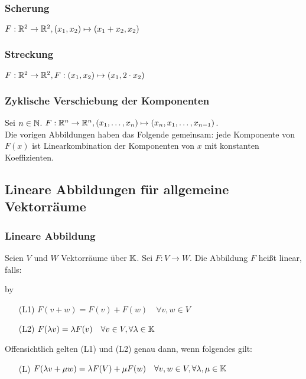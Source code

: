 \subsubsection{Scherung}
	$ F: \mathbb R^2 \to \mathbb R^2, (x_1, x_2) \mapsto (x_1 + x_2, x_2) $

\subsubsection{Streckung}
	$ F: \mathbb R^2 \to \mathbb R^2, F: (x_1, x_2) \mapsto (x_1, 2 \cdot x_2) $

\subsubsection{Zyklische Verschiebung der Komponenten}
	Sei $ n \in \mathbb N $. $ F : \mathbb R^n \to \mathbb R^n, (x_1, \ldots, x_n) \mapsto (x_n, x_1, \ldots, x_{n-1}) $.\\[10pt]
	Die vorigen Abbildungen haben das Folgende gemeinsam: jede Komponente von $ F(x) $ ist Linearkombination der Komponenten von $ x $ mit konstanten Koeffizienten.

\subsection{Lineare Abbildungen für allgemeine Vektorräume}
\subsubsection{Lineare Abbildung}
Seien $ V $ und $ W $ Vektorräume über $ \mathbb K $. Sei $ F: V \to W $. Die Abbildung $ F $ heißt linear, falls:

\advance\myindent by \the{}

\begin{itemize}
	\item [(L1)]
		$ F(v+w) = F(v) + F(w) \quad \forall v,w \in V $
	\item [(L2)]
		$ F(\lambda v) = \lambda F(v) \quad \forall v \in V, \forall \lambda \in \mathbb K $
\end{itemize}
\begin{bem}
	Offensichtlich gelten (L1) und (L2) genau dann, wenn folgendes gilt:
	\begin{itemize}[leftmargin=\myindent]
		\item[(L)]
			$ F(\lambda v + \mu w) = \lambda F(V) + \mu F(w) \quad \forall v,w \in V, \forall \lambda, \mu \in \mathbb K $
	\end{itemize}
\end{bem}

